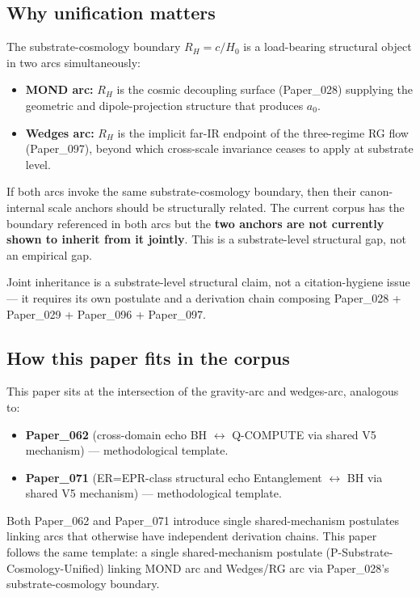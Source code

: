 \documentclass[11pt,a4paper]{article}
\begin{document}
\subsection{Why unification matters}

The substrate-cosmology boundary $R_H = c/H_0$ is a load-bearing structural object in two arcs simultaneously:

\begin{itemize}[noitemsep]
\item \textbf{MOND arc:} $R_H$ is the cosmic decoupling surface (Paper\_028) supplying the geometric and dipole-projection structure that produces $a_0$.
\item \textbf{Wedges arc:} $R_H$ is the implicit far-IR endpoint of the three-regime RG flow (Paper\_097), beyond which cross-scale invariance ceases to apply at substrate level.
\end{itemize}

If both arcs invoke the same substrate-cosmology boundary, then their canon-internal scale anchors should be structurally related. The current corpus has the boundary referenced in both arcs but the \textbf{two anchors are not currently shown to inherit from it jointly}. This is a substrate-level structural gap, not an empirical gap.

Joint inheritance is a substrate-level structural claim, not a citation-hygiene issue --- it requires its own postulate and a derivation chain composing Paper\_028 + Paper\_029 + Paper\_096 + Paper\_097.

\subsection{How this paper fits in the corpus}

This paper sits at the intersection of the gravity-arc and wedges-arc, analogous to:

\begin{itemize}[noitemsep]
\item \textbf{Paper\_062} (cross-domain echo BH $\leftrightarrow$ Q-COMPUTE via shared V5 mechanism) --- methodological template.
\item \textbf{Paper\_071} (ER=EPR-class structural echo Entanglement $\leftrightarrow$ BH via shared V5 mechanism) --- methodological template.
\end{itemize}

Both Paper\_062 and Paper\_071 introduce single shared-mechanism postulates linking arcs that otherwise have independent derivation chains. This paper follows the same template: a single shared-mechanism postulate (P-Substrate-Cosmology-Unified) linking MOND arc and Wedges/RG arc via Paper\_028's substrate-cosmology boundary.
\end{document}
